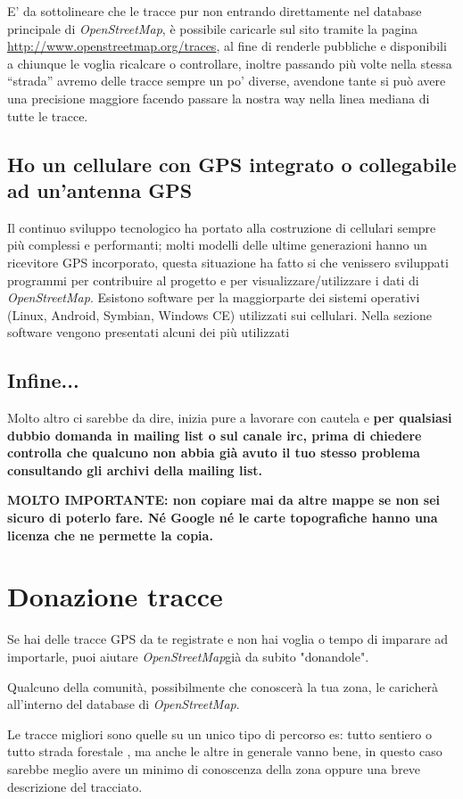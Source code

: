 \documentclass[a4paper,twoside,12pt,]{article}
\newcommand{\osm}{\emph{OpenStreetMap\xspace}}
\newcommand{\gps}{GPS\xspace}
\begin{document}
E' da sottolineare che le tracce pur non entrando direttamente nel database principale di \osm, è possibile caricarle sul sito tramite la pagina \url{http://www.openstreetmap.org/traces}, al fine di renderle pubbliche e disponibili a chiunque le voglia ricalcare o controllare, inoltre passando più volte nella stessa ``strada'' avremo delle tracce sempre un po' diverse, avendone tante si può avere una precisione maggiore facendo passare la nostra way nella linea mediana di tutte le tracce.
\subsection{Ho un cellulare con \gps integrato o collegabile ad un'antenna \gps}
Il continuo sviluppo tecnologico ha portato alla costruzione di cellulari sempre più complessi e performanti; molti modelli delle ultime generazioni hanno un ricevitore \gps incorporato, questa situazione ha fatto si che venissero sviluppati programmi per contribuire al progetto e per visualizzare/utilizzare i dati di \osm. Esistono software per la maggiorparte dei sistemi operativi (Linux, Android, Symbian, Windows CE) utilizzati sui cellulari. Nella sezione software vengono presentati alcuni dei più utilizzati 

\subsection{Infine...}
Molto altro ci sarebbe da dire, inizia pure a lavorare con cautela e \textbf{per qualsiasi dubbio domanda in mailing list o sul canale irc, prima di chiedere controlla che qualcuno non abbia già avuto il tuo stesso problema consultando gli archivi della mailing list.}

\textbf{MOLTO IMPORTANTE: non copiare mai da altre mappe se non sei sicuro di poterlo fare. Né Google né le carte topografiche hanno una licenza che ne permette la copia.}

\section{Donazione tracce}
Se hai delle tracce \gps da te registrate e non hai voglia o tempo di imparare ad importarle, puoi aiutare \osm già da subito "donandole".

Qualcuno della comunità, possibilmente che conoscerà la tua zona, le caricherà all'interno del database di \osm.

Le tracce migliori sono quelle su un unico tipo di percorso es: tutto sentiero o tutto strada forestale , ma anche le altre in generale vanno bene, in questo caso sarebbe meglio avere un minimo di conoscenza della zona oppure una breve descrizione del tracciato.
\end{document}
